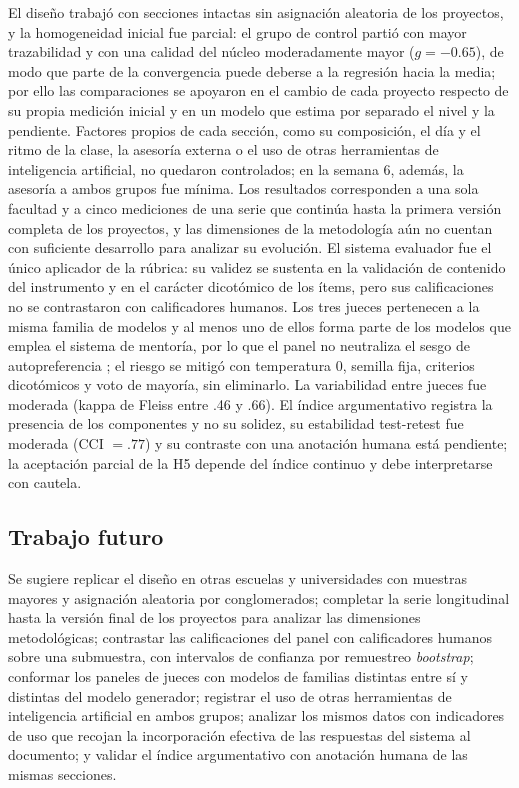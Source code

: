 \documentclass[journal]{IEEEtran}
\begin{document}
El diseño trabajó con secciones intactas sin asignación aleatoria de los proyectos, y la homogeneidad inicial fue parcial: el grupo de control partió con mayor trazabilidad y con una calidad del núcleo moderadamente mayor ($g = -0.65$), de modo que parte de la convergencia puede deberse a la regresión hacia la media; por ello las comparaciones se apoyaron en el cambio de cada proyecto respecto de su propia medición inicial y en un modelo que estima por separado el nivel y la pendiente. Factores propios de cada sección, como su composición, el día y el ritmo de la clase, la asesoría externa o el uso de otras herramientas de inteligencia artificial, no quedaron controlados; en la semana 6, además, la asesoría a ambos grupos fue mínima. Los resultados corresponden a una sola facultad y a cinco mediciones de una serie que continúa hasta la primera versión completa de los proyectos, y las dimensiones de la metodología aún no cuentan con suficiente desarrollo para analizar su evolución. El sistema evaluador fue el único aplicador de la rúbrica: su validez se sustenta en la validación de contenido del instrumento y en el carácter dicotómico de los ítems, pero sus calificaciones no se contrastaron con calificadores humanos. Los tres jueces pertenecen a la misma familia de modelos y al menos uno de ellos forma parte de los modelos que emplea el sistema de mentoría, por lo que el panel no neutraliza el sesgo de autopreferencia \cite{panickssery2024}; el riesgo se mitigó con temperatura 0, semilla fija, criterios dicotómicos y voto de mayoría, sin eliminarlo. La variabilidad entre jueces fue moderada (kappa de Fleiss entre .46 y .66). El índice argumentativo registra la presencia de los componentes y no su solidez, su estabilidad test-retest fue moderada (CCI $= .77$) y su contraste con una anotación humana está pendiente; la aceptación parcial de la H5 depende del índice continuo y debe interpretarse con cautela.

\subsection{Trabajo futuro}

Se sugiere replicar el diseño en otras escuelas y universidades con muestras mayores y asignación aleatoria por conglomerados; completar la serie longitudinal hasta la versión final de los proyectos para analizar las dimensiones metodológicas; contrastar las calificaciones del panel con calificadores humanos sobre una submuestra, con intervalos de confianza por remuestreo \emph{bootstrap}; conformar los paneles de jueces con modelos de familias distintas entre sí y distintas del modelo generador; registrar el uso de otras herramientas de inteligencia artificial en ambos grupos; analizar los mismos datos con indicadores de uso que recojan la incorporación efectiva de las respuestas del sistema al documento; y validar el índice argumentativo con anotación humana de las mismas secciones.
\end{document}
